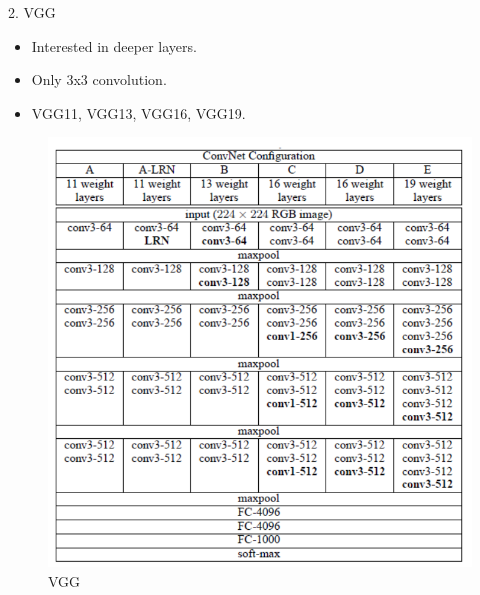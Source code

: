 \documentclass{beamer}
\begin{document}
\begin{frame}{2. VGG}
	\begin{itemize}
		\item Interested in deeper layers.
		\item Only 3x3 convolution.
		\item VGG11, VGG13, VGG16, VGG19.
	\end{itemize}
	\begin{figure}[h]		
		\centering
		\includegraphics[scale=0.38]{./vgg/VGG_1.PNG}
		\caption{VGG}
		\label{VGG}
	\end{figure}
\end{frame}
\end{document}
